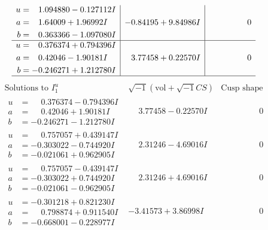 \documentclass[1p]{elsarticle_modified}
\theoremstyle{definition}
\newcommand{\I}{\sqrt{-1}}
\begin{document}
$$\begin{array}{c|c|c}
\begin{aligned}
u &= \phantom{-}1.094880 - 0.127112 I \\
a &= \phantom{-}1.64009 + 1.96992 I \\
b &= \phantom{-}0.363366 - 1.097080 I\end{aligned}
 & -0.84195 + 9.84986 I & \phantom{-0.000000 } 0 \\ \hline\begin{aligned}
u &= \phantom{-}0.376374 + 0.794396 I \\
a &= \phantom{-}0.42046 - 1.90181 I \\
b &= -0.246271 + 1.212780 I\end{aligned}
 & \phantom{-}3.77458 + 0.22570 I & \phantom{-0.000000 } 0\\
 \hline 
 \end{array}$$\newpage$$\begin{array}{c|c|c}  
\text{Solutions to }I^u_{1}& \I (\text{vol} + \sqrt{-1}CS) & \text{Cusp shape}\\
 \hline 
\begin{aligned}
u &= \phantom{-}0.376374 - 0.794396 I \\
a &= \phantom{-}0.42046 + 1.90181 I \\
b &= -0.246271 - 1.212780 I\end{aligned}
 & \phantom{-}3.77458 - 0.22570 I & \phantom{-0.000000 } 0 \\ \hline\begin{aligned}
u &= \phantom{-}0.757057 + 0.439147 I \\
a &= -0.303022 - 0.744920 I \\
b &= -0.021061 + 0.962905 I\end{aligned}
 & \phantom{-}2.31246 - 4.69016 I & \phantom{-0.000000 } 0 \\ \hline\begin{aligned}
u &= \phantom{-}0.757057 - 0.439147 I \\
a &= -0.303022 + 0.744920 I \\
b &= -0.021061 - 0.962905 I\end{aligned}
 & \phantom{-}2.31246 + 4.69016 I & \phantom{-0.000000 } 0 \\ \hline\begin{aligned}
u &= -0.301218 + 0.821230 I \\
a &= \phantom{-}0.798874 + 0.911540 I \\
b &= -0.668001 - 0.228977 I\end{aligned}
 & -3.41573 + 3.86998 I & \phantom{-0.000000 } 0 \\ \hline\begin{aligned}

\end{aligned}
\end{array}$$
\end{document}
